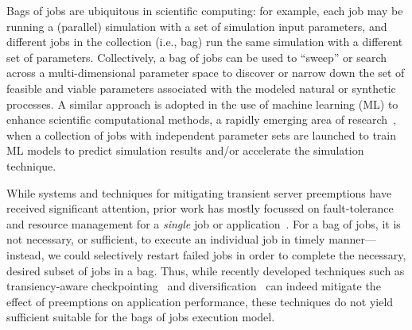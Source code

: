 
Bags of jobs are ubiquitous in scientific computing: for example, each job may be running a (parallel) simulation with a set of simulation input parameters, and different jobs in the collection (i.e., bag) run the same simulation with a different set of  parameters. 
Collectively, a bag of jobs can be used to ``sweep'' or search across a multi-dimensional parameter space to discover or narrow down the set of feasible and viable parameters associated with the modeled natural or synthetic processes.
A similar approach is adopted in the use of machine learning (ML) to enhance scientific computational methods, a rapidly emerging area of research~\cite{}, when a collection of jobs with independent parameter sets are launched to train ML models to predict simulation results and/or accelerate the simulation technique. 



While systems and techniques for mitigating transient server preemptions have received significant attention, prior work has mostly focussed on fault-tolerance and resource management for a \emph{single} job or application~\cite{spoton, exosphere, flint, marathe2014exploiting}. 
For a bag of jobs, it is not necessary, or sufficient, to execute an individual job in timely manner---instead, we could selectively restart failed jobs in order to complete the necessary, desired subset of jobs in a bag.
Thus, while recently developed techniques such as transiency-aware checkpointing~\cite{marathe2014exploiting, flint}
and diversification~\cite{exosphere, spotweb} can indeed mitigate the effect of preemptions on application performance, these techniques do not yield sufficient  suitable for the bags of jobs execution model. 



